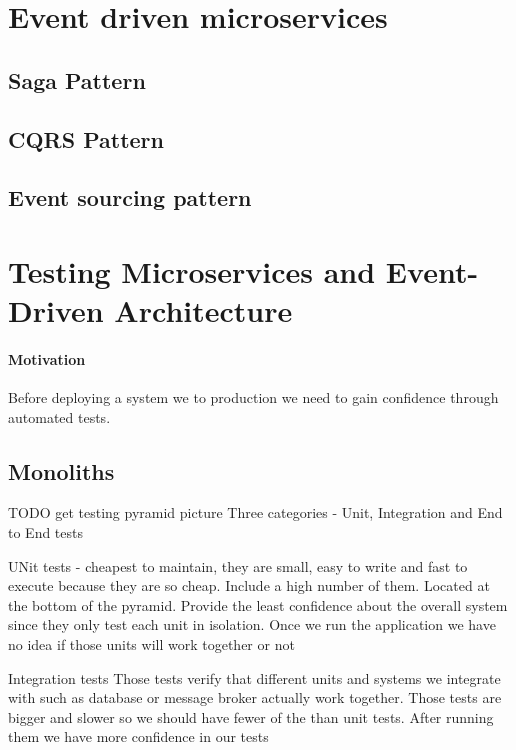 \documentclass[a4paper, 11pt]{book}
\begin{document}
    \section{Event driven microservices}

    \subsection{Saga Pattern}

    \subsection{CQRS Pattern}

    \subsection{Event sourcing pattern}


    \section{Testing Microservices and Event-Driven Architecture}

    \paragraph{Motivation} Before deploying a system we to production we need to gain confidence through automated tests.

    \subsection{Monoliths}
    TODO get testing pyramid picture
    Three categories - Unit, Integration and End to End tests

    UNit tests - cheapest to maintain, they are small, easy to write and fast to execute because they are so cheap.
    Include a high number of them.
    Located at the bottom of the pyramid.
    Provide the least confidence about the overall system since they only test each unit in isolation.
    Once we run the application we have no idea if those units will work together or not

    Integration tests
    Those tests verify that different units and systems we integrate with such as database or message broker actually work together.
    Those tests are bigger and slower so we should have fewer of the than unit tests.
    After running them we have more confidence in our tests
\end{document}
